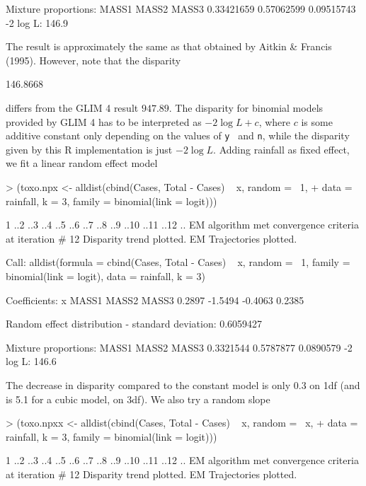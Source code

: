 \documentclass[a4paper]{article}
\begin{document}
\begin{landscape}
\begin{Schunk}
\begin{Soutput}
Mixture proportions:
     MASS1       MASS2       MASS3  
0.33421659  0.57062599  0.09515743  
-2 log L:	    146.9 
\end{Soutput}
\end{Schunk}
 The result is approximately the same as that obtained by Aitkin \& Francis (1995). However, note that the disparity
\begin{Schunk}
\begin{Soutput}
[1] 146.8668
\end{Soutput}
\end{Schunk}
 differs from the GLIM 4 result $947.89$. The disparity for binomial models provided by GLIM 4 has to be interpreted as  $-2\log L+c$, where $c$ is some 
 additive constant only depending on the values of {\tt y } and {\tt n}, while the disparity given by this R implementation 
 is just $-2\log L$. 
 Adding rainfall as fixed effect, we fit a linear random effect model
\begin{Schunk}
\begin{Sinput}
> (toxo.npx <- alldist(cbind(Cases, Total - Cases) ~ x, random = ~1, 
+     data = rainfall, k = 3, family = binomial(link = logit)))
\end{Sinput}
\begin{Soutput}
1 ..2 ..3 ..4 ..5 ..6 ..7 ..8 ..9 ..10 ..11 ..12 ..
EM algorithm met convergence criteria at iteration #  12 
Disparity trend plotted.
EM Trajectories plotted.

Call:  alldist(formula = cbind(Cases, Total - Cases) ~ x, random = ~1,      family = binomial(link = logit), data = rainfall, k = 3) 

Coefficients:
      x    MASS1    MASS2    MASS3  
 0.2897  -1.5494  -0.4063   0.2385  

Random effect distribution - standard deviation:	   0.6059427 

Mixture proportions:
    MASS1      MASS2      MASS3  
0.3321544  0.5787877  0.0890579  
-2 log L:	    146.6 
\end{Soutput}
\end{Schunk}
   The decrease in disparity compared to the constant model is only 0.3 on 1df (and is 5.1 for a cubic model, on 3df). %
 We also try a random slope
\begin{Schunk}
\begin{Sinput}
> (toxo.npxx <- alldist(cbind(Cases, Total - Cases) ~ x, random = ~x, 
+     data = rainfall, k = 3, family = binomial(link = logit)))
\end{Sinput}
\begin{Soutput}
1 ..2 ..3 ..4 ..5 ..6 ..7 ..8 ..9 ..10 ..11 ..12 ..
EM algorithm met convergence criteria at iteration #  12 
Disparity trend plotted.
EM Trajectories plotted.


\end{Soutput}
\end{Schunk}
\end{landscape}
\end{document}
